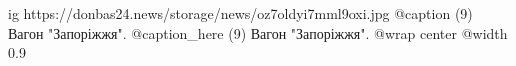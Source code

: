  
 
 
 
 

\ifcmt
  ig https://donbas24.news/storage/news/oz7oldyi7mml9oxi.jpg
	@caption (9) Вагон "Запоріжжя".
	@caption_here (9) Вагон "Запоріжжя".
  @wrap center
  @width 0.9
\fi
